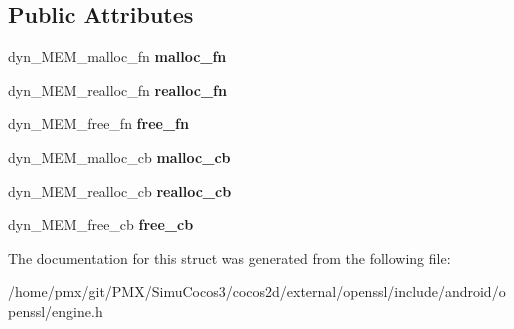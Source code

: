 \subsection*{Public Attributes}
\begin{DoxyCompactItemize}
\item 
\mbox{\label{structst__dynamic__MEM__fns_ae4353e82854c2a52697d94a53d2bb45a}} 
dyn\+\_\+\+M\+E\+M\+\_\+malloc\+\_\+fn {\bfseries malloc\+\_\+fn}
\item 
\mbox{\label{structst__dynamic__MEM__fns_a402e9fb824c3d0aeb37ee06ca819f516}} 
dyn\+\_\+\+M\+E\+M\+\_\+realloc\+\_\+fn {\bfseries realloc\+\_\+fn}
\item 
\mbox{\label{structst__dynamic__MEM__fns_a9d5a7c6725007cfcf4b83988c53c2d59}} 
dyn\+\_\+\+M\+E\+M\+\_\+free\+\_\+fn {\bfseries free\+\_\+fn}
\item 
\mbox{\label{structst__dynamic__MEM__fns_af75222a0702aedaf6a9d1156ef9784ed}} 
dyn\+\_\+\+M\+E\+M\+\_\+malloc\+\_\+cb {\bfseries malloc\+\_\+cb}
\item 
\mbox{\label{structst__dynamic__MEM__fns_a40fb5719d28a6c452821f0cb0eca231a}} 
dyn\+\_\+\+M\+E\+M\+\_\+realloc\+\_\+cb {\bfseries realloc\+\_\+cb}
\item 
\mbox{\label{structst__dynamic__MEM__fns_aa6b8fe1b3872985cac1a62edacc1e983}} 
dyn\+\_\+\+M\+E\+M\+\_\+free\+\_\+cb {\bfseries free\+\_\+cb}
\end{DoxyCompactItemize}


The documentation for this struct was generated from the following file\+:\begin{DoxyCompactItemize}
\item 
/home/pmx/git/\+P\+M\+X/\+Simu\+Cocos3/cocos2d/external/openssl/include/android/openssl/engine.\+h\end{DoxyCompactItemize}
